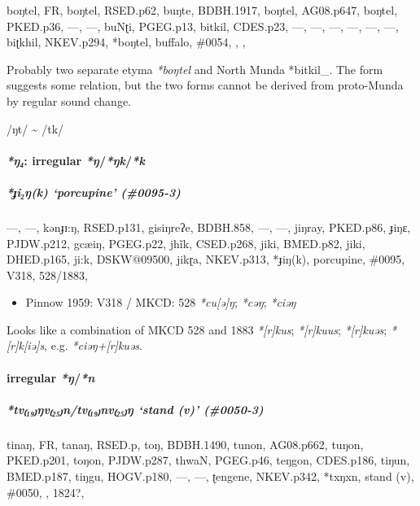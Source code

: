 \documentclass[a4paper,]{article}
\providecommand{\tightlist}{%
  \setlength{\itemsep}{0pt}\setlength{\parskip}{0pt}}
\let\oldparagraph\paragraph
\renewcommand{\paragraph}[1]{\oldparagraph{#1}\mbox{}}
\let\oldsubparagraph\subparagraph
\renewcommand{\subparagraph}[1]{\oldsubparagraph{#1}\mbox{}}
\begin{document}
boŋtel, FR, boŋtel, RSED.p62, buŋte, BDBH.1917, boŋtel, AG08.p647,
boŋtel, PKED.p36, ---, ---, buNʈi, PGEG.p13, bitkil, CDES.p23, ---, ---,
---, ---, ---, ---, biʈkhil, NKEV.p294, *boŋtel, buffalo, \#0054, , ,

Probably two separate etyma \emph{*boŋtel} and North Munda *bitkil\_.
The form suggests some relation, but the two forms cannot be derived
from proto-Munda by regular sound change.

/ŋt/ \textasciitilde{} /tk/

\paragraph{\texorpdfstring{\emph{*ŋ₄}: irregular
\emph{*ŋ}/\emph{*ŋk}/\emph{*k}}{*ŋ₄: irregular *ŋ/*ŋk/*k}}\label{ux14b-irregular-ux14bux14bkk}

\subparagraph{\texorpdfstring{\emph{*ɟi₂ŋ(k)} `porcupine'
(\#0095-3)}{*ɟi₂ŋ(k) porcupine (\#0095-3)}}\label{ux25fiux14bk-porcupine-0095-3}

---, ---, kənɟɪ:ŋ, RSED.p131, gisiŋreʔe, BDBH.858, ---, ---, jiŋray,
PKED.p86, ɟiŋɛ, PJDW.p212, gcæiŋ, PGEG.p22, jhĩk, CSED.p268, jiki,
BMED.p82, jiki, DHED.p165, ji:k, DSKW@09500, jikɽa, NKEV.p313, *ɟiŋ(k),
porcupine, \#0095, V318, 528/1883,

\begin{itemize}
\tightlist
\item
  Pinnow 1959: V318 / MKCD: 528 \emph{*cu{[}ə{]}ŋ}; \emph{*cəŋ};
  \emph{*ciəŋ}
\end{itemize}

Looks like a combination of MKCD 528 and 1883 \emph{*{[}r{]}kus};
\emph{*{[}r{]}kuus}; \emph{*{[}r{]}kuəs}; \emph{*{[}r{]}k{[}iə{]}s},
e.g. \emph{*ciəŋ+{[}r{]}kuəs}.

\paragraph{\texorpdfstring{irregular
\emph{*ŋ}/\emph{*n}}{irregular *ŋ/*n}}\label{irregular-ux14bn}

\subparagraph{\texorpdfstring{\emph{*tv₍₁₉₎ŋv₍₂₅₎n/tv₍₁₉₎nv₍₂₅₎ŋ} `stand
(v)'
(\#0050-3)}{*tv₍₁₉₎ŋv₍₂₅₎n/tv₍₁₉₎nv₍₂₅₎ŋ stand (v) (\#0050-3)}}\label{tvux14bvntvnvux14b-stand-v-0050-3-1}

tinaŋ, FR, tanaŋ, RSED.p, toŋ, BDBH.1490, tunon, AG08.p662, tuŋon,
PKED.p201, toŋon, PJDW.p287, thwaN, PGEG.p46, teŋgon, CDES.p186, tiŋun,
BMED.p187, tiŋgu, HOGV.p180, ---, ---, ʈengene, NKEV.p342, *txŋxn, stand
(v), \#0050, , 1824?,
\end{document}
